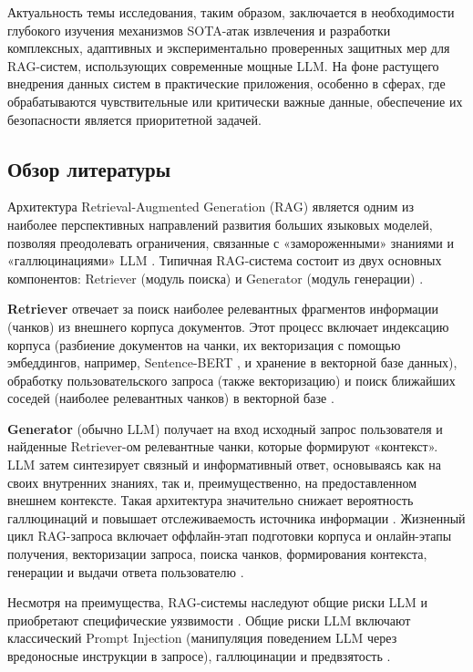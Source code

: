 \documentclass[12pt, a4paper]{article}
\theoremstyle{definition}
\theoremstyle{remark}
\begin{document}
Актуальность темы исследования, таким образом, заключается в необходимости глубокого изучения механизмов SOTA-атак извлечения и разработки комплексных, адаптивных и экспериментально проверенных защитных мер для RAG-систем, использующих современные мощные LLM. На фоне растущего внедрения данных систем в практические приложения, особенно в сферах, где обрабатываются чувствительные или критически важные данные, обеспечение их безопасности является приоритетной задачей.

\subsection{Обзор литературы}
\label{sec:literature_review}

Архитектура Retrieval-Augmented Generation (RAG) является одним из наиболее перспективных направлений развития больших языковых моделей, позволяя преодолевать ограничения, связанные с «замороженными» знаниями и «галлюцинациями» LLM \cite{Lewis2020RAG}. Типичная RAG-система состоит из двух основных компонентов: Retriever (модуль поиска) и Generator (модуль генерации) \cite{Shao2024Survey}.

\textbf{Retriever} отвечает за поиск наиболее релевантных фрагментов информации (чанков) из внешнего корпуса документов. Этот процесс включает индексацию корпуса (разбиение документов на чанки, их векторизация с помощью эмбеддингов, например, Sentence-BERT \cite{Reimers2019SBERT}, и хранение в векторной базе данных), обработку пользовательского запроса (также векторизацию) и поиск ближайших соседей (наиболее релевантных чанков) в векторной базе \cite{Shao2024Survey}.

\textbf{Generator} (обычно LLM) получает на вход исходный запрос пользователя и найденные Retriever-ом релевантные чанки, которые формируют «контекст». LLM затем синтезирует связный и информативный ответ, основываясь как на своих внутренних знаниях, так и, преимущественно, на предоставленном внешнем контексте. Такая архитектура значительно снижает вероятность галлюцинаций и повышает отслеживаемость источника информации \cite{Lewis2020RAG}. Жизненный цикл RAG-запроса включает оффлайн-этап подготовки корпуса и онлайн-этапы получения, векторизации запроса, поиска чанков, формирования контекста, генерации и выдачи ответа пользователю \cite{Shao2024Survey}.

Несмотря на преимущества, RAG-системы наследуют общие риски LLM и приобретают специфические уязвимости \cite{Qi2024Survey}. Общие риски LLM включают классический Prompt Injection (манипуляция поведением LLM через вредоносные инструкции в запросе), галлюцинации и предвзятость \cite{Qi2024Survey}.
\end{document}
